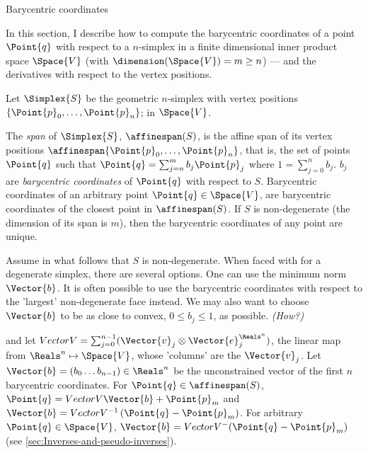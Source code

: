 \begin{plSection}{Barycentric coordinates}
\label{sec:barycentric-coordinates}

In this section, I describe how to compute
the barycentric coordinates of a point $\Point{q}$
with respect to a $n$-simplex in
a finite dimensional inner product space $\Space{V}$
(with $\dimension (\Space{V} ) = m \ge n$) ---
and the derivatives with respect to the vertex positions.

Let $\Simplex{S}$ be the geometric $n$-simplex
with vertex positions $\{\Point{p}_0 , \ldots , \Point{p}_n\}$;
in $\Space{V}$.

The {\it span} of $\Simplex{S}$, $\affinespan ( S )$,
is the affine span of its vertex positions
$\affinespan \{\Point{p}_0 , \ldots , \Point{p}_n\}$,
that is, the set of points $\Point{q}$ such that
$\Point{q} = \sum_{j=n}^{m} b_j \Point{p}_j $ 
where $1 = \sum_{j=0}^{n} b_j $.
$b_j$ are {\it barycentric coordinates} of $\Point{q}$ 
with respect to $S$.
Barycentric coordinates of an arbitrary point 
$\Point{q} \in \Space{V}$,
are barycentric coordinates of the closest point in $\affinespan(S)$.
If $S$ is non-degenerate (the dimension of its span is $m$),
then the barycentric coordinates of any point are unique.

Assume in what follows that $S$ is non-degenerate.
When faced with for a degenerate simplex, there are several options.
One can use the minimum norm $\Vector{b}$.
It is often possible to use the barycentric coordinates
with respect to the 'largest' non-degenerate face instead.
We may also want to choose $\Vector{b}$ to be as close to convex,
$0 \le b_j \le 1$, as possible. {\it (How?)}

and let $Vector{V} =
 \sum_{j=0}^{n-1} ( \Vector{v}_j \otimes \Vector{e}_j^{\Reals^n} )$,
the linear map from $\Reals^n \mapsto \Space{V}$,
whose 'columns' are the $\Vector{v}_j$.
Let $\Vector{b} = \left( b_0 \ldots b_{n-1} \right) \in \Reals^n$
be the unconstrained vector of the first $n$ barycentric coordinates.
For $\Point{q} \in \affinespan ( S )$, 
$\Point{q} = Vector{V} \Vector{b} + \Point{p}_m$
and $\Vector{b} = 
Vector{V}^{-1} \left ( \Point{q} - \Point{p}_m \right)$.
For arbitrary $\Point{q} \in \Space{V}$,
$\Vector{b} = Vector{V}^{-} (\Point{q} - \Point{p}_m)$
(see \cref{sec:Inverses-and-pseudo-inverses}).

\end{plSection}%

